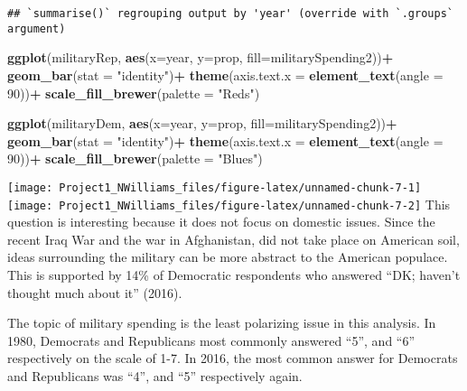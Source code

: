 \documentclass[
]{article}
\newenvironment{Shaded}{\begin{snugshade}}{\end{snugshade}}
\newcommand{\DataTypeTok}[1]{\textcolor[rgb]{0.13,0.29,0.53}{#1}}
\newcommand{\DecValTok}[1]{\textcolor[rgb]{0.00,0.00,0.81}{#1}}
\newcommand{\KeywordTok}[1]{\textcolor[rgb]{0.13,0.29,0.53}{\textbf{#1}}}
\newcommand{\NormalTok}[1]{#1}
\newcommand{\OperatorTok}[1]{\textcolor[rgb]{0.81,0.36,0.00}{\textbf{#1}}}
\newcommand{\StringTok}[1]{\textcolor[rgb]{0.31,0.60,0.02}{#1}}
\begin{document}
\begin{verbatim}
## `summarise()` regrouping output by 'year' (override with `.groups` argument)
\end{verbatim}

\begin{Shaded}
\begin{Highlighting}[]
\KeywordTok{ggplot}\NormalTok{(militaryRep, }\KeywordTok{aes}\NormalTok{(}\DataTypeTok{x=}\NormalTok{year, }\DataTypeTok{y=}\NormalTok{prop, }\DataTypeTok{fill=}\NormalTok{militarySpending2))}\OperatorTok{+}
\StringTok{  }\KeywordTok{geom_bar}\NormalTok{(}\DataTypeTok{stat =} \StringTok{"identity"}\NormalTok{)}\OperatorTok{+}
\StringTok{  }\KeywordTok{theme}\NormalTok{(}\DataTypeTok{axis.text.x =} \KeywordTok{element_text}\NormalTok{(}\DataTypeTok{angle =} \DecValTok{90}\NormalTok{))}\OperatorTok{+}
\StringTok{  }\KeywordTok{scale_fill_brewer}\NormalTok{(}\DataTypeTok{palette =} \StringTok{"Reds"}\NormalTok{)}

\KeywordTok{ggplot}\NormalTok{(militaryDem, }\KeywordTok{aes}\NormalTok{(}\DataTypeTok{x=}\NormalTok{year, }\DataTypeTok{y=}\NormalTok{prop, }\DataTypeTok{fill=}\NormalTok{militarySpending2))}\OperatorTok{+}
\StringTok{  }\KeywordTok{geom_bar}\NormalTok{(}\DataTypeTok{stat =} \StringTok{"identity"}\NormalTok{)}\OperatorTok{+}
\StringTok{  }\KeywordTok{theme}\NormalTok{(}\DataTypeTok{axis.text.x =} \KeywordTok{element_text}\NormalTok{(}\DataTypeTok{angle =} \DecValTok{90}\NormalTok{))}\OperatorTok{+}
\StringTok{  }\KeywordTok{scale_fill_brewer}\NormalTok{(}\DataTypeTok{palette =} \StringTok{"Blues"}\NormalTok{)}
\end{Highlighting}
\end{Shaded}

\texttt{[image: Project1\_NWilliams\_files/figure-latex/unnamed-chunk-7-1]}
\texttt{[image: Project1\_NWilliams\_files/figure-latex/unnamed-chunk-7-2]}
This question is interesting because it does not focus on domestic
issues. Since the recent Iraq War and the war in Afghanistan, did not
take place on American soil, ideas surrounding the military can be more
abstract to the American populace. This is supported by 14\% of
Democratic respondents who answered ``DK; haven't thought much about
it'' (2016).

The topic of military spending is the least polarizing issue in this
analysis. In 1980, Democrats and Republicans most commonly answered
``5'', and ``6'' respectively on the scale of 1-7. In 2016, the most
common answer for Democrats and Republicans was ``4'', and ``5''
respectively again.
\end{document}
